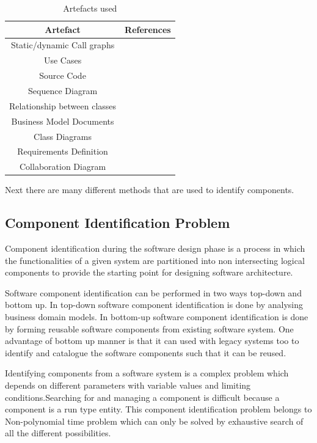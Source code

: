 \documentclass[12pt]{article}
\begin{document}
	\begin{table}
		\caption{Artefacts used }
	\begin{center}
	\begin{tabular}{||c c ||} 
		\hline
		Artefact & References  \\ [0.5ex] 
		\hline\hline
		Static/dynamic Call graphs & \cite{graphPartion}  \\ 
		\hline
		Use Cases & \cite{neural}\cite{genetic}\cite{CRUD} \\
		\hline
		Source Code  & \cite{graphPartion} \\
		\hline
		Sequence Diagram & \cite{CRUD}\cite{2}  \\
		\hline
		Relationship between classes & \cite{genetic}  \\ [1ex] 
		\hline
		Business Model Documents & \cite{graphPartion}\cite{FCA}  \\ [1ex]
		\hline
		Class Diagrams & \cite{genetic}\cite{CRUD}  \\ [1ex]
		\hline
		Requirements Definition & \cite{highCohesionLowCoupling}  \\ [1ex]
		\hline
		Collaboration Diagram & \cite{FCA}  \\ [1ex]
		\hline
	\end{tabular}
\end{center}
\end{table}


Next there are many different methods that are used to identify components.
\subsection{Component Identification Problem}
Component identification during the software design phase is a process in which the functionalities of a given system are partitioned into non intersecting logical components to provide the starting point for designing software architecture.\cite{2}

Software component identification can be performed in two ways top-down and bottom up.
In top-down software component identification is done by analysing business domain models.
In bottom-up software component identification is done by forming reusable software components from existing software system.
One advantage of bottom up manner is that it can used with legacy systems too to identify and catalogue the software components such that it can be reused.

Identifying components from a software system is a complex problem which depends on different parameters with variable values and limiting conditions.Searching for and managing a component is difficult because a component is a run type entity.
This component identification problem belongs to Non-polynomial time problem which can only be solved by exhaustive search of all the different possibilities.
\end{document}
